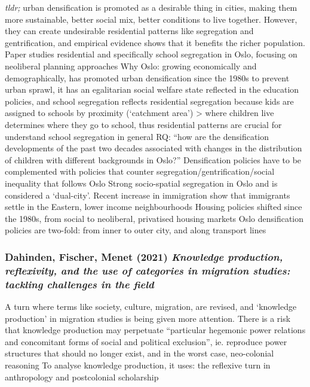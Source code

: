 \documentclass{article}
\begin{document}
\begin{outline}
	\1 \textit{tldr;} urban densification is promoted as a desirable thing in cities, making them more sustainable, better social mix, better conditions to live together. However, they can create undesirable residential patterns like segregation and gentrification, and empirical evidence shows that it benefits the richer population. Paper studies residential and specifically school segregation in Oslo, focusing on neoliberal planning approaches
	\1 Why Oslo: growing economically and demographically, has promoted urban densification since the 1980s to prevent urban sprawl, it has an egalitarian social welfare state reflected in the education policies, and school segregation reflects residential segregation because kids are assigned to schools by proximity (`catchment area') > where children live determines where they go to school, thus residential patterns are crucial for understand school segregation in general
	\1 RQ: ``how are the densification developments of the past two decades associated with changes in the distribution of children with different backgrounds in Oslo?''
	\1 Densification policies have to be complemented with policies that counter segregation/gentrification/social inequality that follows
	\1 Oslo
		\2 Strong socio-spatial segregation in Oslo and is considered a `dual-city'. Recent increase in immigration show that immigrants settle in the Eastern, lower income neighbourhoods
		\2 Housing policies shifted since the 1980s, from social to neoliberal, privatised housing markets
		\2 Oslo densification policies are two-fold: from inner to outer city, and along transport lines
\end{outline}

\subsubsection{Dahinden, Fischer, Menet (2021) \textit{Knowledge production, reflexivity, and the use of categories in migration studies: tackling challenges in the field}}

\begin{outline}
	\1 A turn where terms like society, culture, migration, are revised, and `knowledge production' in migration studies is being given more attention. There is a risk that knowledge production may perpetuate ``particular hegemonic power relations and concomitant forms of social and political exclusion'', ie. reproduce power structures that should no longer exist, and in the worst case, neo-colonial reasoning
	\1 To analyse knowledge production, it uses: the reflexive turn in anthropology and postcolonial scholarship
\end{outline}
\end{document}
